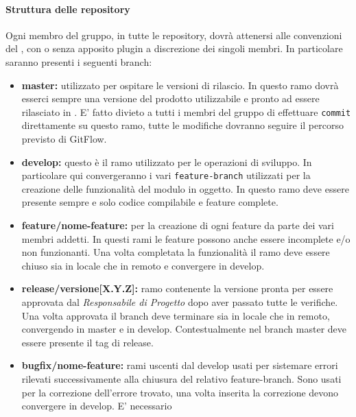 \paragraph{Struttura delle repository}
Ogni membro del gruppo, in tutte le repository, dovrà attenersi alle convenzioni del , con o senza apposito plugin a discrezione dei singoli membri.
In particolare saranno presenti i seguenti branch:
\begin{itemize}
    \item \textbf{master:} utilizzato per ospitare le versioni di rilascio. In questo ramo dovrà esserci sempre una versione del prodotto utilizzabile
                           e pronto ad essere rilasciato in . E' fatto divieto a tutti i membri del gruppo di effettuare \verb|commit|
                           direttamente su questo ramo, tutte le modifiche dovranno seguire il percorso previsto di GitFlow.
    \item \textbf{develop:} questo è il ramo utilizzato per le operazioni di sviluppo. In particolare qui convergeranno i vari \verb|feature-branch|
                            utilizzati per la creazione delle funzionalità del modulo in oggetto. In questo ramo deve essere presente sempre e solo codice
                            compilabile e feature complete.
    \item \textbf{feature/nome-feature:} per la creazione di ogni feature da parte dei vari membri addetti. In questi rami le feature possono anche essere
                                         incomplete e/o non funzionanti. Una volta completata la funzionalità il ramo deve essere chiuso sia in locale che in remoto e 
                                         convergere in develop.
    \item \textbf{release/versione[X.Y.Z]:} ramo contenente la versione  pronta per essere approvata dal \textit{Responsabile di Progetto} dopo
                                            aver passato tutte le verifiche. Una volta approvata il branch deve terminare sia in locale che in remoto, convergendo in master e in develop.
                                            Contestualmente nel branch master deve essere presente il tag di release.
    \item \textbf{bugfix/nome-feature:} rami uscenti dal develop usati per sistemare errori rilevati successivamente alla chiusura del relativo feature-branch.
                                       Sono usati per la correzione dell'errore trovato, una volta inserita la correzione devono convergere in develop. E' necessario

\end{itemize}
